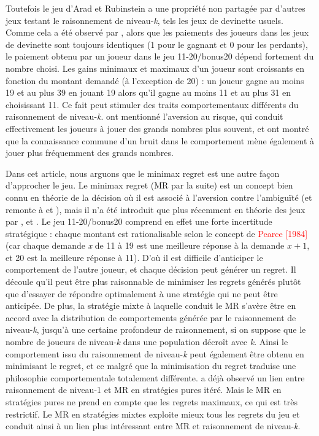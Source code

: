\begin{Article}
\begin{refsection}[UmbhauerFR]
Toutefois le jeu d'Arad et Rubinstein a une propriété non partagée par
d'autres jeux testant le raisonnement de niveau-\emph{k}, tels les jeux
de devinette usuels. Comme cela a été observé par \textcite{li2018},
alors que les paiements des joueurs dans les jeux de devinette sont
toujours identiques (1 pour le gagnant et 0 pour les perdants), le
paiement obtenu par un joueur dans le jeu 11-20/bonus20 dépend fortement
du nombre choisi. Les gains minimaux et maximaux d'un joueur sont
croissants en fonction du montant demandé (à l'exception de 20) : un
joueur gagne au moins 19 et au plus 39 en jouant 19 alors qu'il gagne au
moins 11 et au plus 31 en choisissant 11. Ce fait peut stimuler des
traits comportementaux différents du raisonnement de niveau-\emph{k}. \textcite{li2018} ont mentionné l'aversion au risque, qui conduit
effectivement les joueurs à jouer des grands nombres plus souvent, et
\textcite{goeree2018} ont montré que la connaissance commune d'un
bruit dans le comportement mène également à jouer plus fréquemment des
grands nombres.

\enlargethispage{\baselineskip}

Dans cet article, nous arguons que le minimax regret est une autre façon
d'approcher le jeu. Le minimax regret (MR par la suite) est un concept
bien connu en théorie de la décision où il est associé à l'aversion
contre l'ambiguïté (et remonte à \textcite{savage1951} et \textcite{niehans1948}), mais il n'a été introduit que plus récemment en théorie des
jeux par \textcite{linhart1989}, \textcite{renou2010} et \textcite{halpern2012}. 
Le jeu 11-20/bonus20 comprend en effet une forte incertitude stratégique : chaque montant est rationalisable selon le concept de \textcolor{red}{Pearce [1984]} (car chaque demande \emph{x} de 11 à 19 est une meilleure réponse à la demande \(x + 1\), et 20 est la meilleure réponse à 11). D'où il est difficile d'anticiper le comportement de
l'autre joueur, et chaque décision peut générer un regret. Il découle
qu'il peut être plus raisonnable de minimiser les regrets générés plutôt
que d'essayer de répondre optimalement à une stratégie qui ne peut être
anticipée. De plus, la stratégie mixte à laquelle conduit le MR s'avère être
en accord avec la distribution de comportements générée par le
raisonnement de niveau-\emph{k}, jusqu'à une certaine profondeur de
raisonnement, si on suppose que le nombre de joueurs de niveau-\emph{k}
dans une population décroît avec \emph{k}. Ainsi le comportement issu du
raisonnement de niveau-\emph{k} peut également être obtenu en minimisant
le regret, et ce malgré que la minimisation du regret traduise une
philosophie comportementale totalement différente. \textcite{garciapola2020} a déjà observé un lien entre raisonnement de niveau-1 et MR
en stratégies pures itéré. Mais le MR en stratégies pures ne prend en
compte que les regrets maximaux, ce qui est très restrictif. Le MR en
stratégies mixtes exploite mieux tous les regrets du jeu et conduit
ainsi à un lien plus intéressant entre MR et raisonnement de
niveau-\emph{k}.


\end{refsection}
\end{Article}
